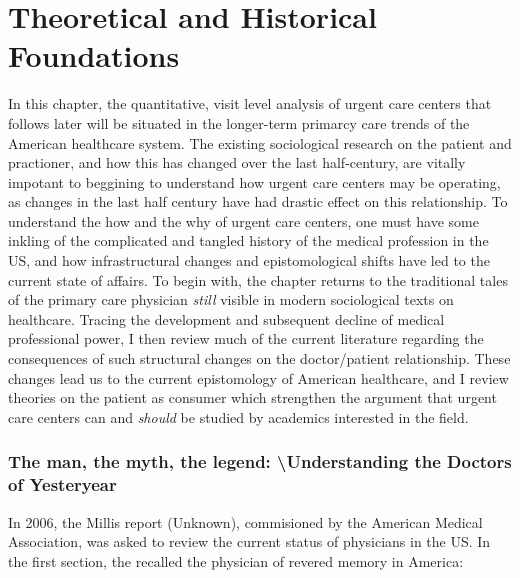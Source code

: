 \documentclass[12pt,twoside]{reedthesis}
\begin{document}
  \chapter*{Theoretical and Historical
  Foundations}\label{theoretical-and-historical-foundations}
  
  \onehalfspacing
  
  In this chapter, the quantitative, visit level analysis of urgent care
  centers that follows later will be situated in the longer-term primarcy
  care trends of the American healthcare system. The existing sociological
  research on the patient and practioner, and how this has changed over
  the last half-century, are vitally impotant to beggining to understand
  how urgent care centers may be operating, as changes in the last half
  century have had drastic effect on this relationship. To understand the
  how and the why of urgent care centers, one must have some inkling of
  the complicated and tangled history of the medical profession in the US,
  and how infrastructural changes and epistomological shifts have led to
  the current state of affairs. To begin with, the chapter returns to the
  traditional tales of the primary care physician \emph{still} visible in
  modern sociological texts on healthcare. Tracing the development and
  subsequent decline of medical professional power, I then review much of
  the current literature regarding the consequences of such structural
  changes on the doctor/patient relationship. These changes lead us to the
  current epistomology of American healthcare, and I review theories on
  the patient as consumer which strengthen the argument that urgent care
  centers can and \emph{should} be studied by academics interested in the
  field.
  
  \subsection*{The man, the myth, the legend:
  \textbackslash{}Understanding the Doctors of
  Yesteryear}\label{the-man-the-myth-the-legend-understanding-the-doctors-of-yesteryear}
  
  In 2006, the Millis report (Unknown), commisioned by the American
  Medical Association, was asked to review the current status of
  physicians in the US. In the first section, the recalled the physician
  of revered memory in America:
  
\end{document}
